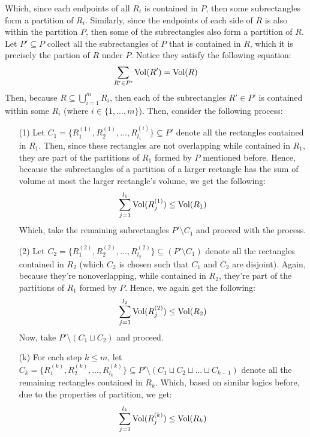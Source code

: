 \documentclass{article}
\begin{document}
Which, since each endpoints of all $R_i$ is contained in $P$, then some subrectangles form a partition of $R_i$. Similarly, since the endpoints of each side of $R$ is also within the partition $P$, then some of the subrectangles also form a partition of $R$. Let $P'\subseteq P$ collect all the subrectangles of $P$ that is contained in $R$, which it is precisely the partion of $R$ under $P$. Notice they satisfy the following equation:
\begin{equation}
    \sum_{R'\in P'}\textmd{Vol}(R') = \textmd{Vol}(R)
\end{equation}
Then, because $R\subseteq \bigcup_{i=1}^m R_i$, then each of the subrectangles $R'\in P'$ is contained within some $R_i$ (where $i\in\{1,...,m\}$). Then, consider the following process:
\begin{itemize}
    \item[(1)] Let $C_1=\{R_1^{(1)},R_2^{(1)},...,R_{l_1}^{(i)}\}\subseteq P'$ denote all the rectangles contained in $R_1$. Then, since these rectangles are not overlapping while contained in $R_1$, they are part of the partitions of $R_1$ formed by $P$ mentioned before. Hence, because the subrectangles of a partition of a larger rectangle has the sum of volume at most the larger rectangle's volume, we get the following:
    \begin{equation}
        \sum_{j=1}^{l_1}\textmd{Vol}(R_j^{(1)})\leq \textmd{Vol}(R_1)
    \end{equation}
    Which, take the remaining subrectangles $P'\setminus C_1$ and proceed with the process.
    \item[(2)] Let $C_2=\{R_1^{(2)},R_2^{(2)},...,R_{l_2}^{(2)}\}\subseteq (P'\setminus C_1)$ denote all the rectangles contained in $R_2$ (which $C_2$ is chosen such that $C_1$ and $C_2$ are disjoint). Again, because they're nonoverlapping, while contained in $R_2$, they're part of the partitions of $R_1$ formed by $P$. Hence, we again get the following:
    \begin{equation}
        \sum_{j=1}^{l_2}\textmd{Vol}(R_j^{(2)})\leq \textmd{Vol}(R_2)
    \end{equation}
    Now, take $P'\setminus (C_1\sqcup C_2)$ and proceed.
    \item[(k)] For each step $k\leq m$, let $C_k = \{R_1^{(k)},R_2^{(k)},...,R_{l_k}^{(k)}\}\subseteq P'\setminus(C_1\sqcup C_2\sqcup...\sqcup C_{k-1})$ denote all the remaining rectangles contained in $R_k$. Which, based on similar logics before, due to the properties of partition, we get:
    \begin{equation}
        \sum_{j=1}^{l_k}\textmd{Vol}(R_j^{(k)})\leq \textmd{Vol}(R_k)
    \end{equation}
\end{itemize} 
\end{document}
